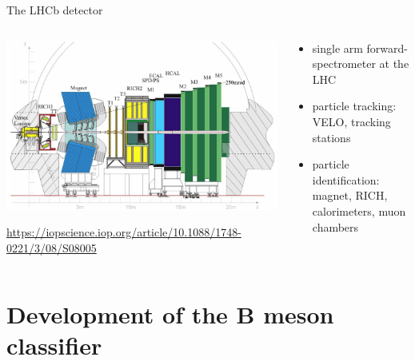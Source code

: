 \documentclass[aspectratio=1610, 10pt]{beamer}
\begin{document}
\begin{frame}{The LHCb detector}
  \begin{columns}
    \begin{column}{0.6\textwidth}
      \centering
      \includegraphics[width=\textwidth]{images/lhcb_detector.png}

      \tiny \url{https://iopscience.iop.org/article/10.1088/1748-0221/3/08/S08005}
    \end{column}
    \begin{column}{0.4\textwidth}
      \begin{itemize}
        \item single arm forward-spectrometer at the LHC %
        \item particle tracking: VELO, tracking stations
        \item particle identification: magnet, RICH, calorimeters, muon chambers
      \end{itemize}
    \end{column}
  \end{columns}
\end{frame}

\section*{Development of the B meson classifier}
\end{document}
